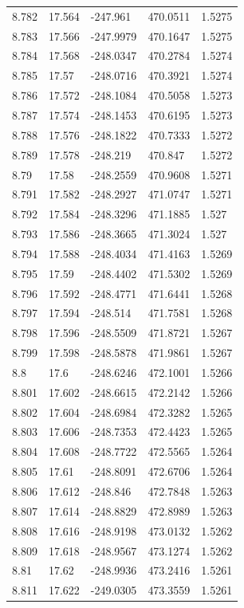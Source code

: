 \begin{tabular}{lllll}
8.782 & 17.564 & -247.961 & 470.0511 & 1.5275 \\
8.783 & 17.566 & -247.9979 & 470.1647 & 1.5275 \\
8.784 & 17.568 & -248.0347 & 470.2784 & 1.5274 \\
8.785 & 17.57 & -248.0716 & 470.3921 & 1.5274 \\
8.786 & 17.572 & -248.1084 & 470.5058 & 1.5273 \\
8.787 & 17.574 & -248.1453 & 470.6195 & 1.5273 \\
8.788 & 17.576 & -248.1822 & 470.7333 & 1.5272 \\
8.789 & 17.578 & -248.219 & 470.847 & 1.5272 \\
8.79 & 17.58 & -248.2559 & 470.9608 & 1.5271 \\
8.791 & 17.582 & -248.2927 & 471.0747 & 1.5271 \\
8.792 & 17.584 & -248.3296 & 471.1885 & 1.527 \\
8.793 & 17.586 & -248.3665 & 471.3024 & 1.527 \\
8.794 & 17.588 & -248.4034 & 471.4163 & 1.5269 \\
8.795 & 17.59 & -248.4402 & 471.5302 & 1.5269 \\
8.796 & 17.592 & -248.4771 & 471.6441 & 1.5268 \\
8.797 & 17.594 & -248.514 & 471.7581 & 1.5268 \\
8.798 & 17.596 & -248.5509 & 471.8721 & 1.5267 \\
8.799 & 17.598 & -248.5878 & 471.9861 & 1.5267 \\
8.8 & 17.6 & -248.6246 & 472.1001 & 1.5266 \\
8.801 & 17.602 & -248.6615 & 472.2142 & 1.5266 \\
8.802 & 17.604 & -248.6984 & 472.3282 & 1.5265 \\
8.803 & 17.606 & -248.7353 & 472.4423 & 1.5265 \\
8.804 & 17.608 & -248.7722 & 472.5565 & 1.5264 \\
8.805 & 17.61 & -248.8091 & 472.6706 & 1.5264 \\
8.806 & 17.612 & -248.846 & 472.7848 & 1.5263 \\
8.807 & 17.614 & -248.8829 & 472.8989 & 1.5263 \\
8.808 & 17.616 & -248.9198 & 473.0132 & 1.5262 \\
8.809 & 17.618 & -248.9567 & 473.1274 & 1.5262 \\
8.81 & 17.62 & -248.9936 & 473.2416 & 1.5261 \\
8.811 & 17.622 & -249.0305 & 473.3559 & 1.5261 \\

\end{tabular}
